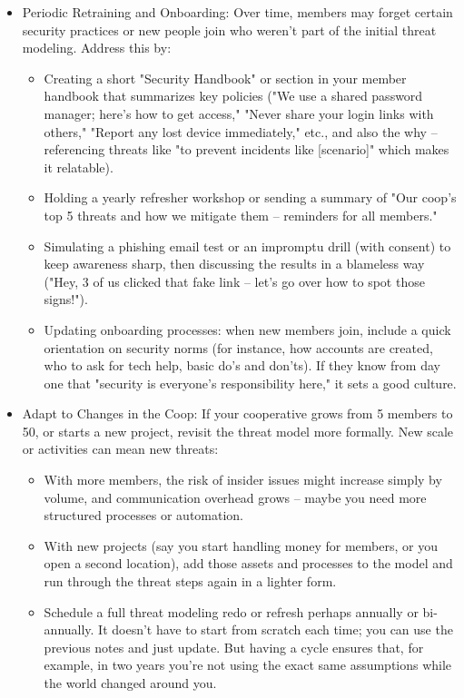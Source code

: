 \begin{itemize}
    \item Periodic Retraining and Onboarding: Over time, members may forget certain security practices
    or new people join who weren't part of the initial threat modeling. Address this by:
        \begin{itemize}
            \item Creating a short "Security Handbook" or section in your member handbook that summarizes
            key policies ("We use a shared password manager; here's how to get access," "Never share your login
            links with others," "Report any lost device immediately," etc., and also the why – referencing
            threats like "to prevent incidents like [scenario]" which makes it relatable).
            \item Holding a yearly refresher workshop or sending a summary of "Our coop's top 5 threats and how
            we mitigate them – reminders for all members."
            \item Simulating a phishing email test or an impromptu drill (with consent) to keep awareness
            sharp, then discussing the results in a blameless way ("Hey, 3 of us clicked that fake link – let's
            go over how to spot those signs!").
            \item Updating onboarding processes: when new members join, include a quick orientation on security
            norms (for instance, how accounts are created, who to ask for tech help, basic do's and don'ts). If
            they know from day one that "security is everyone's responsibility here," it sets a good culture.
        \end{itemize}

    \item Adapt to Changes in the Coop: If your cooperative grows from 5 members to 50, or starts a new
    project, revisit the threat model more formally. New scale or activities can mean new threats:
        \begin{itemize}
            \item With more members, the risk of insider issues might increase simply by volume, and
            communication overhead grows – maybe you need more structured processes or automation.
            \item With new projects (say you start handling money for members, or you open a second location),
            add those assets and processes to the model and run through the threat steps again in a lighter
            form.
            \item Schedule a full threat modeling redo or refresh perhaps annually or bi-annually. It doesn't
            have to start from scratch each time; you can use the previous notes and just update. But having a
            cycle ensures that, for example, in two years you're not using the exact same assumptions while the
            world changed around you.
        \end{itemize}


\end{itemize}
